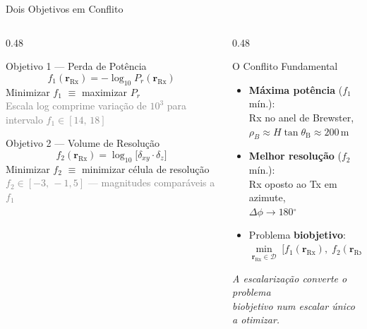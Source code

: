 \documentclass[aspectratio=169, 10pt]{beamer}
\newcommand{\Rx}{\mathrm{Rx}}
\newcommand{\rRx}{\mathbf{r}_{\Rx}}
\newcommand{\dxy}{\delta_{xy}}
\newcommand{\dz}{\delta_z}
\newcommand{\thetaB}{\theta_{\mathrm{B}}}
\newcommand{\gdeg}{\ensuremath{^{\circ}}}
\begin{document}
\begin{frame}{Dois Objetivos em Conflito}
  \begin{columns}[T]
    \begin{column}{0.48\textwidth}
      \begin{block}{Objetivo 1 --- Perda de Potência}
        \begin{equation*}
          f_1(\rRx) = -\log_{10} P_r(\rRx)
        \end{equation*}
        Minimizar $f_1$ $\equiv$ maximizar $P_r$\\[4pt]
        \textcolor{gray}{\small Escala log comprime variação de $10^3$
        para intervalo $f_1 \in [14,\,18]$}
      \end{block}
      \vspace{0.5em}
      \begin{block}{Objetivo 2 --- Volume de Resolução}
        \begin{equation*}
          f_2(\rRx) = \log_{10}\!\bigl[\dxy \cdot \dz\bigr]
        \end{equation*}
        Minimizar $f_2$ $\equiv$ minimizar célula de resolução\\[4pt]
        \textcolor{gray}{\small $f_2 \in [-3,\,-1{,}5]$ ---
        magnitudes comparáveis a $f_1$}
      \end{block}
    \end{column}
    \begin{column}{0.48\textwidth}
      \begin{alertblock}{O Conflito Fundamental}
        \begin{itemize}
          \item \textbf{Máxima potência} ($f_1$ mín.):\\
                Rx no anel de Brewster,\\
                $\rho_B \approx H\tan\thetaB \approx 200\,\mathrm{m}$
          \vspace{0.4em}
          \item \textbf{Melhor resolução} ($f_2$ mín.):\\
                Rx oposto ao Tx em azimute,\\
                $\Delta\phi \to 180\gdeg$
          \vspace{0.5em}
          \item[$\Rightarrow$] Problema \textbf{biobjetivo}:
            \begin{equation*}
              \min_{\rRx \in \mathcal{D}}\;
              \bigl[f_1(\rRx),\;f_2(\rRx)\bigr]^{\!\top}
            \end{equation*}
        \end{itemize}
      \end{alertblock}
      \vspace{0.4em}
      \centering
      \small\textit{A escalarização converte o problema\\
      biobjetivo num escalar único a otimizar.}
    \end{column}
  \end{columns}
\end{frame}
\end{document}
